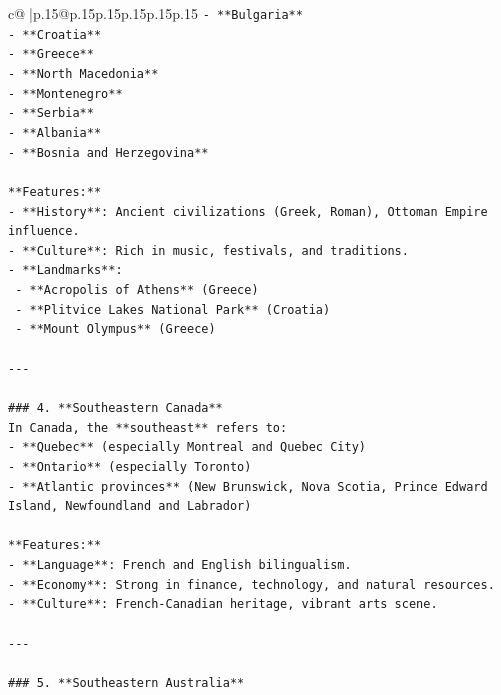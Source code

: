 \documentclass{article}
\begin{document}
{\begin{supertabular}{c@{$\;$}|p{.15\linewidth}@{}p{.15\linewidth}p{.15\linewidth}p{.15\linewidth}p{.15\linewidth}p{.15\linewidth}}
{{{\texttt{{-} **Bulgaria**} \\
\texttt{{-} **Croatia**} \\
\texttt{{-} **Greece**} \\
\texttt{{-} **North Macedonia**} \\
\texttt{{-} **Montenegro**} \\
\texttt{{-} **Serbia**} \\
\texttt{{-} **Albania**} \\
\texttt{{-} **Bosnia and Herzegovina**} \\
\\ 
\texttt{**Features:**} \\
\texttt{{-} **History**: Ancient civilizations (Greek, Roman), Ottoman Empire influence.} \\
\texttt{{-} **Culture**: Rich in music, festivals, and traditions.} \\
\texttt{{-} **Landmarks**:  } \\
\texttt{  {-} **Acropolis of Athens** (Greece)  } \\
\texttt{  {-} **Plitvice Lakes National Park** (Croatia)  } \\
\texttt{  {-} **Mount Olympus** (Greece)  } \\
\\ 
\texttt{{-}{-}{-}} \\
\\ 
\texttt{\#\#\# 4. **Southeastern Canada**} \\
\texttt{In Canada, the **southeast** refers to:} \\
\texttt{{-} **Quebec** (especially Montreal and Quebec City)} \\
\texttt{{-} **Ontario** (especially Toronto)} \\
\texttt{{-} **Atlantic provinces** (New Brunswick, Nova Scotia, Prince Edward Island, Newfoundland and Labrador)} \\
\\ 
\texttt{**Features:**} \\
\texttt{{-} **Language**: French and English bilingualism.} \\
\texttt{{-} **Economy**: Strong in finance, technology, and natural resources.} \\
\texttt{{-} **Culture**: French{-}Canadian heritage, vibrant arts scene.} \\
\\ 
\texttt{{-}{-}{-}} \\
\\ 
\texttt{\#\#\# 5. **Southeastern Australia**} \\
}}}
\end{supertabular}}
\end{document}
